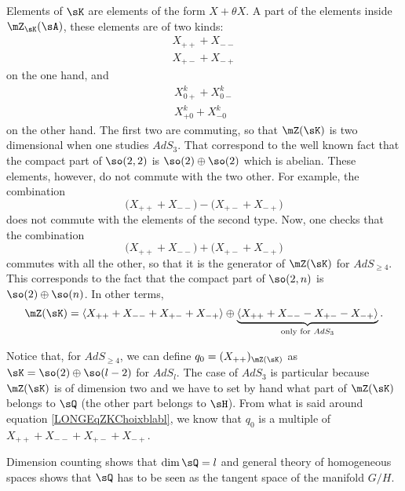 Elements of $\sK$ are elements of the form $X+\theta X$. A part of the elements inside $\mZ_{\sK}(\sA)$, these elements are of two kinds:
\begin{subequations}
	\begin{align}
		X_{++}+X_{--} \\
		X_{+-}+X_{-+}
	\end{align}
\end{subequations}
on the one hand, and
\begin{subequations}
	\begin{align}
		X^k_{0+}+X^k_{0-} \\
		X^k_{+0}+X^k_{-0}
	\end{align}
\end{subequations}
on the other hand. The first two are commuting, so that $\mZ(\sK)$ is two dimensional when one studies $AdS_3$. That correspond to the well known fact that the compact part of $\so(2,2)$ is $\so(2)\oplus\so(2)$ which is abelian. These elements, however, do not commute with the two other. For example, the combination
\begin{equation}
	\big( X_{++}+X_{--}\big)-\big(X_{+-}+X_{-+}\big)
\end{equation}
does not commute with the elements of the second type. Now, one checks that the combination
\begin{equation}		\label{LONGEqZKChoixblabl}
	\big( X_{++}+X_{--}\big)+\big( X_{+-}+X_{-+})
\end{equation}
commutes with all the other, so that it is the generator of $\mZ(\sK)$ for $AdS_{\geq 4}$. This corresponds to the fact that the compact part of $\so(2,n)$ is $\so(2)\oplus\so(n)$. In other terms,
\begin{equation}		\label{LONGEqDecompZKenDeuxSuivantDim}
	\mZ(\sK)=\langle X_{++}+X_{--}+X_{+-}+X_{-+}\rangle\oplus\underbrace{\langle X_{++}+X_{--}-X_{+-}-X_{-+}\rangle}_{\text{only for }AdS_3}.
\end{equation}


Notice that, for $AdS_{\geq 4}$, we can define $q_0=(X_{++})_{\mZ(\sK)}$ as $\sK=\so(2)\oplus\so(l-2)$ for $AdS_l$. The case of $AdS_3$ is particular because $\mZ(\sK)$ is of dimension two and we have to set by hand what part of $\mZ(\sK)$ belongs to $\sQ$ (the other part belongs to $\sH$). From what is said around equation \eqref{LONGEqZKChoixblabl}, we know that $q_0$ is a multiple of $X_{++}+X_{--}+X_{+-}+X_{-+}$.

Dimension counting shows that $\dim\sQ=l$ and general theory of homogeneous spaces shows that $\sQ$ has to be seen as the tangent space of the manifold $G/H$.

